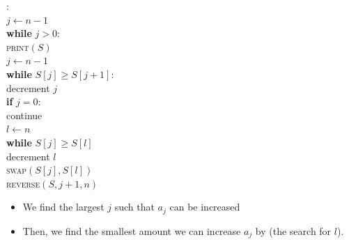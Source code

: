 \documentclass[aspectratio=169]{beamer}
\begin{document}
\begin{frame}{}
\begin{minipage}[c]{0.6\textwidth}
\begin{nalgo}
: 
\\\label{}  $j \gets n-1$
\\\label{}  \textbf{while} $j > 0$:\+
\\\label{}      \textsc{print}$(S)$
\\\label{}      $j \gets n-1$
\\\label{}      \textbf{while} $S[j] \geq S[j+1]$:\+
\\\label{}          decrement $j$\-
\\\label{}      \textbf{if} $j = 0$: \+
\\\label{}          continue \-
\\\label{}      $l \gets n$
\\\label{}      \textbf{while} $S[j] \geq S[l]$ \+
\\\label{}          decrement $l$\-
\\\label{}      \textsc{swap}$(S[j], S[l])$
\\\label{}{\color{lightgray}      \textsc{reverse}$(S, j+1, n)$}
\end{nalgo}
\end{minipage}
\begin{minipage}[c]{0.35\textwidth}
\begin{itemize}
    \item We find the largest $j$ such that $a_j$ can be increased\pause
    \item Then, we find the smallest amount we can increase $a_j$ by (the search for $l$).
\end{itemize}
\end{minipage}
\end{frame}
\end{document}
